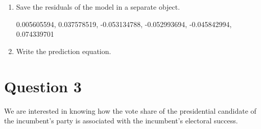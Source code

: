 \documentclass[12pt,letterpaper]{article}
\begin{document}
\begin{enumerate}
		\item Save the residuals of the model in a separate object.
			 
			0.005605594,  0.037578519, -0.053134788, -0.052993694, -0.045842994,  0.074339701 
			\vspace{5cm}
		\item Write the prediction equation.
			 
	\end{enumerate}
	
\section*{Question 3}

\noindent We are interested in knowing how the vote share of the presidential candidate of the incumbent's party is associated with the incumbent's electoral success.
	\vspace{.25cm}
\end{document}

